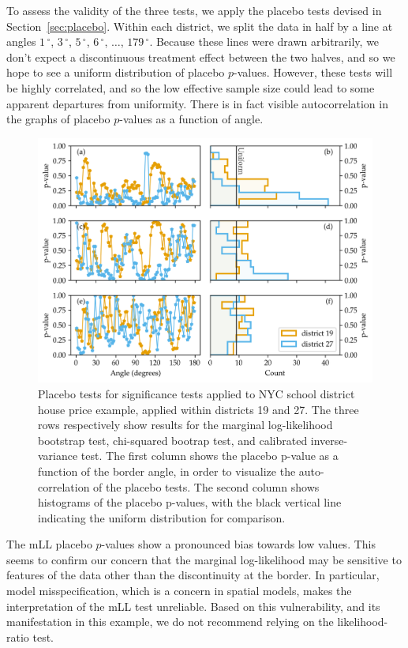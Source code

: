 \documentclass[letter]{article}
\makeatletter
\def\maxwidth{\ifdim\Gin@nat@width>\linewidth\linewidth
\else\Gin@nat@width\fi}
\let\Oldincludegraphics\includegraphics
\renewcommand{\includegraphics}[1]{\Oldincludegraphics[width=0.9\maxwidth]{#1}}
\newcommand{\degree}{{\,^\circ}}
\makeatother
\begin{document}
    	To assess the validity of the three tests, we apply the placebo tests devised in Section~\ref{sec:placebo}.
Within each district, we split the data in half by a line at angles \(1\degree\), \(3\degree\), \(5\degree\), \(6\degree\), \(\dotsc\), \(179\degree\).
Because these lines were drawn arbitrarily, we don't expect a discontinuous treatment effect between the two halves, and so we hope to see a uniform distribution of placebo \(p\)-values.
However, these tests will be highly correlated,
and so the low effective sample size could lead to some apparent departures from uniformity.
There is in fact visible autocorrelation in the graphs of placebo \(p\)-values as a function of angle.
    


    	\begin{figure}
\centering
\includegraphics{../NYC/NYC_plots/NYC_placebos.png}
\caption{\label{fig:nyc_placebos} Placebo tests for significance tests applied to NYC school district house price example, applied within districts 19 and 27. The three rows respectively show results for the marginal log-likelihood bootstrap test, chi-squared bootrap test, and calibrated inverse-variance test. The first column shows the placebo p-value as a function of the border angle, in order to visualize the auto-correlation of the placebo tests. The second column shows histograms of the placebo p-values, with the black vertical line indicating the uniform distribution for comparison.}
\end{figure}
    


    	The mLL placebo \(p\)-values show a pronounced bias towards low values.
This seems to confirm our concern that the marginal log-likelihood may be sensitive to features of the data other than the discontinuity at the border.
In particular, model misspecification, which is a concern in spatial models, makes the interpretation of the mLL test unreliable.
Based on this vulnerability, and its manifestation in this example, we do not recommend relying on the likelihood-ratio test.
\end{document}
